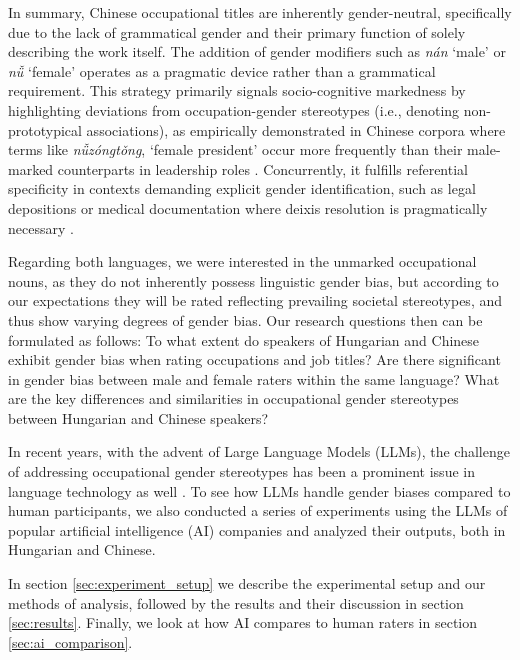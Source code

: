 \documentclass[11pt]{article}
\newcommand{\zh}[1]{\simplifiedchinesefont{#1}\rmfamily}
\begin{document}
In summary, Chinese occupational titles are inherently gender-neutral, specifically due to the lack of grammatical gender and their primary function of solely describing the work itself. The addition of gender modifiers such as \zh{男} \textit{nán} `male' or \zh{女} \textit{nǚ} `female' operates as a pragmatic device rather than a grammatical requirement. This strategy primarily signals socio-cognitive markedness by highlighting deviations from occupation-gender stereotypes (i.e., denoting non-prototypical associations), as empirically demonstrated in Chinese corpora where terms like \zh{女总统} \textit{nǚzóngtǒng}, `female president' occur more frequently than their male-marked counterparts in leadership roles \citep{su_2021_occupational,farris_1988_gender}. Concurrently, it fulfills referential specificity in contexts demanding explicit gender identification, such as legal depositions or medical documentation where deixis resolution is pragmatically necessary \citep{hellinger_2003_gender,stahlberg_2011_representation}.


Regarding both languages, we were interested in the unmarked occupational nouns, as they do not inherently possess linguistic gender bias, but according to our expectations they will be rated reflecting prevailing societal stereotypes, and thus show varying degrees of gender bias. Our research questions then can be formulated as follows: To what extent do speakers of Hungarian and Chinese exhibit gender bias when rating occupations and job titles? Are there significant in gender bias between male and female raters within the same language? What are the key differences and similarities in occupational gender stereotypes between Hungarian and Chinese speakers? 

In recent years, with the advent of Large Language Models (LLMs), the challenge of addressing occupational gender stereotypes has been a prominent issue in language technology as well \citep[cf.][]{kirk_2021_bias,ju_2024_female,an_2025_mutual}. To see how LLMs handle gender biases compared to human participants, we also conducted a series of experiments using the LLMs of popular artificial intelligence (AI) companies and analyzed their outputs, both in Hungarian and Chinese.

In section \ref{sec:experiment_setup} we describe the experimental setup and our methods of analysis, followed by the results and their discussion in section \ref{sec:results}. Finally, we look at how AI compares to human raters in section \ref{sec:ai_comparison}.
\end{document}
